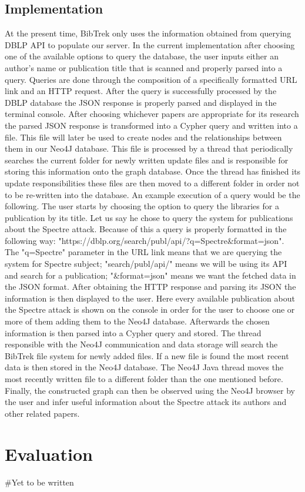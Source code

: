 \documentclass{article}
\begin{document}
\subsection{Implementation}
At the present time, BibTrek only uses the information obtained from querying DBLP API to populate our server. In the current implementation after choosing one of the available options to query the database, the user inputs either an author's name or publication title that is scanned and properly parsed into a query. Queries are done through the composition of a specifically formatted URL link and an HTTP request. After the query is successfully processed by the DBLP database the JSON response is properly parsed and displayed in the terminal console. After choosing whichever papers are appropriate for its research the parsed JSON response is transformed into a Cypher query and written into a file. This file will later be used to create nodes and the relationships between them in our Neo4J database. This file is processed by a thread that periodically searches the current folder for newly written update files and is responsible for storing this information onto the graph database. Once the thread has finished its update responsibilities these files are then moved to a different folder in order not to be re-written into the database. An example execution of a query would be the following. The user starts by choosing the option to query the libraries for a publication by its title. Let us say he chose to query the system for publications about the Spectre attack. Because of this a query is properly formatted in the following way: "https://dblp.org/search/publ/api/?q=Spectre&format=json". The "q=Spectre" parameter in the URL link means that we are querying the system for Spectre subject; "search/publ/api/" means we will be using its API and search for a publication; "&format=json" means we want the fetched data in the JSON format. After obtaining the HTTP response and parsing its JSON the information is then displayed to the user. Here every available publication about the Spectre attack is shown on the console in order for the user to choose one or more of them adding them to the Neo4J database. Afterwards the chosen information is then parsed into a Cypher query and stored. The thread responsible with the Neo4J communication and data storage will search the BibTrek file system for newly added files. If a new file is found the most recent data is then stored in the Neo4J database. The Neo4J Java thread moves the most recently written file to a different folder than the one mentioned before. Finally, the constructed graph can then be observed using the Neo4J browser by the user and infer useful information about the Spectre attack its authors and other related papers.

\section{Evaluation}
#Yet to be written
\end{document}
